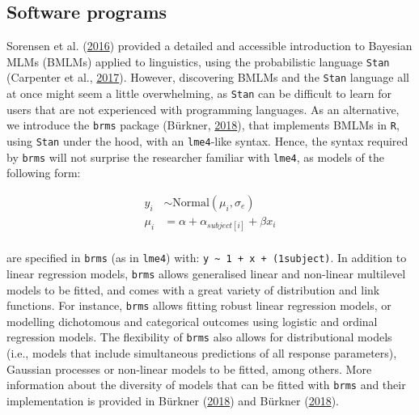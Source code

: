 \documentclass[a4paper,12pt,twoside,openright,oldfontcommands]{memoir}
\begin{document}
\hypertarget{software-programs}{%
\subsection{Software programs}\label{software-programs}}

Sorensen et al. (\protect\hyperlink{ref-sorensen_bayesian_2016}{2016}) provided a detailed and accessible introduction to Bayesian MLMs (BMLMs) applied to linguistics, using the probabilistic language \texttt{Stan} (Carpenter et al., \protect\hyperlink{ref-carpenter_stan_2017}{2017}). However, discovering BMLMs and the \texttt{Stan} language all at once might seem a little overwhelming, as \texttt{Stan} can be difficult to learn for users that are not experienced with programming languages. As an alternative, we introduce the \texttt{brms} package (Bürkner, \protect\hyperlink{ref-R-brms}{2018}), that implements BMLMs in \texttt{R}, using \texttt{Stan} under the hood, with an \texttt{lme4}-like syntax. Hence, the syntax required by \texttt{brms} will not surprise the researcher familiar with \texttt{lme4}, as models of the following form:

\[
\begin{aligned}
y_{i} &\sim \mathrm{Normal}(\mu_{i}, \sigma_{e}) \\
\mu_{i} &= \alpha + \alpha_{subject[i]} + \beta x_{i} \\
\end{aligned}
\]

\vspace{5mm}

are specified in \texttt{brms} (as in \texttt{lme4}) with: \texttt{y\ \textasciitilde{}\ 1\ +\ x\ +\ (1\textbar{}subject)}. In addition to linear regression models, \texttt{brms} allows generalised linear and non-linear multilevel models to be fitted, and comes with a great variety of distribution and link functions. For instance, \texttt{brms} allows fitting robust linear regression models, or modelling dichotomous and categorical outcomes using logistic and ordinal regression models. The flexibility of \texttt{brms} also allows for distributional models (i.e., models that include simultaneous predictions of all response parameters), Gaussian processes or non-linear models to be fitted, among others. More information about the diversity of models that can be fitted with \texttt{brms} and their implementation is provided in Bürkner (\protect\hyperlink{ref-R-brms}{2018}) and Bürkner (\protect\hyperlink{ref-burkner_advanced_2018}{2018}).
\end{document}
